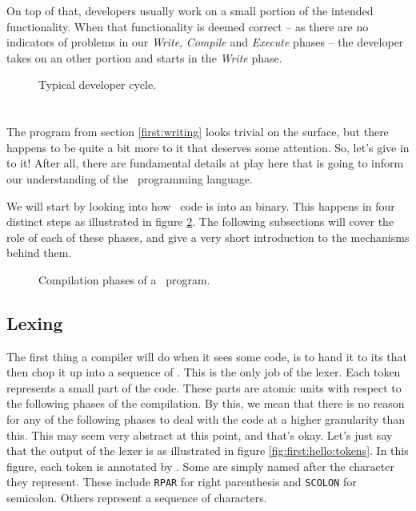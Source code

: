 On top of that, developers usually work on a small portion of the intended functionality. When that functionality is deemed correct -- as there are no indicators of problems in our \textsl{Write}, \textsl{Compile} and \textsl{Execute} phases -- the developer takes on an other portion and starts in the \textsl{Write} phase.

\begin{figure}[tbp]
  
  \caption{Typical developer cycle.}
  \label{fig:first:phases:cycle}
\end{figure}

\section{\csharp}

The program from section \ref{first:writing} looks trivial on the surface, but there happens to be quite a bit more to it that deserves some attention. So, let's give in to it! After all, there are fundamental details at play here that is going to inform our understanding of the \csharp\ programming language.

We will start by looking into how \csharp\ code is  into an  binary. This happens in four distinct steps as illustrated in figure \ref{fig:first:csharp:compilation:phases}. The following subsections will cover the role of each of these phases, and give a very short introduction to the mechanisms behind them.

\begin{figure}[tbp]
  
  \caption{Compilation phases of a \csharp\ program.}
  \label{fig:first:csharp:compilation:phases}
\end{figure}

\subsection{Lexing}

The first thing a compiler will do when it sees some code, is to hand it to its  that then chop it up into a sequence of . This is the only job of the lexer. Each token represents a small part of the code. These parts are atomic units with respect to the following phases of the compilation. By this, we mean that there is no reason for any of the following phases to deal with the code at a higher granularity than this. This may seem very abstract at this point, and that's okay. Let's just say that the output of the lexer is as illustrated in figure \ref{fig:first:hello:tokens}. In this figure, each token is annotated by . Some are simply named after the character they represent. These include \texttt{RPAR} for right parenthesis and \texttt{SCOLON} for semicolon. Others represent a sequence of characters.

